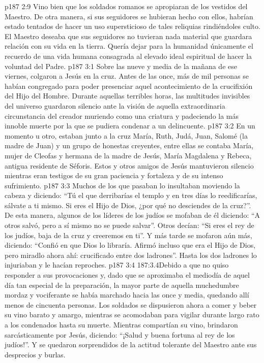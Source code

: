 \vs p187 2:9 \pc Vino bien que los soldados romanos se apropiaran de los vestidos del Maestro. De otra manera, si sus seguidores se hubieran hecho con ellos, habrían estado tentados de hacer un uso supersticioso de tales reliquias rindiéndoles culto. El Maestro deseaba que sus seguidores no tuvieran nada material que guardara relación con su vida en la tierra. Quería dejar para la humanidad únicamente el recuerdo de una vida humana consagrada al elevado ideal espiritual de hacer la voluntad del Padre.
\vs p187 3:1 Sobre las nueve y media de la mañana de ese viernes, colgaron a Jesús en la cruz. Antes de las once, más de mil personas se habían congregado para poder presenciar aquel acontecimiento de la crucifixión del Hijo del Hombre. Durante aquellas terribles horas, las multitudes invisibles del universo guardaron silencio ante la visión de aquella extraordinaria circunstancia del creador muriendo como una criatura y padeciendo la más innoble muerte por la que se pudiera condenar a un delincuente.
\vs p187 3:2 En un momento u otro, estaban junto a la cruz María, Ruth, Judá, Juan, Salomé (la madre de Juan) y un grupo de honestas creyentes, entre ellas se contaba María, mujer de Cleofas y hermana de la madre de Jesús, María Magdalena y Rebeca, antigua residente de Séforis. Estos y otros amigos de Jesús mantuvieron silencio mientras eran testigos de su gran paciencia y fortaleza y de su intenso sufrimiento.
\vs p187 3:3 Muchos de los que pasaban lo insultaban moviendo la cabeza y diciendo: “Tú el que derribarías el templo y en tres días lo reedificarías, sálvate a ti mismo. Si eres el Hijo de Dios, ¿por qué no desciendes de la cruz?”. De esta manera, algunos de los líderes de los judíos se mofaban de él diciendo: “A otros salvó, pero a sí mismo no se puede salvar”. Otros decían: “Si eres el rey de los judíos, baja de la cruz y creeremos en ti”. Y más tarde se mofaron aún más, diciendo: “Confió en que Dios lo libraría. Afirmó incluso que era el Hijo de Dios, pero miradlo ahora ahí: crucificado entre dos ladrones”. Hasta los dos ladrones lo injuriaban y le hacían reproches.
\vs p187 3:4 187:3.4Debido a que no quiso responder a sus provocaciones y, dado que se aproximaba el mediodía de aquel día tan especial de la preparación, la mayor parte de aquella muchedumbre mordaz y vociferante se había marchado hacia las once y media, quedando allí menos de cincuenta personas. Los soldados se dispusieron ahora a comer y beber su vino barato y amargo, mientras se acomodaban para vigilar durante largo rato a los condenados hasta su muerte. Mientras compartían su vino, brindaron sarcásticamente por Jesús, diciendo: “¡Salud y buena fortuna al rey de los judíos!”. Y se quedaron sorprendidos de la actitud tolerante del Maestro ante sus desprecios y burlas.
